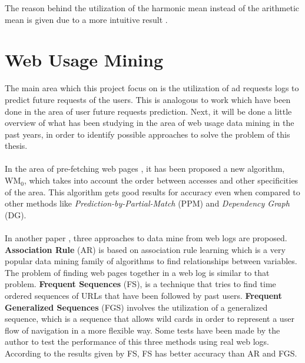 The reason behind the utilization of the harmonic mean instead of the arithmetic mean
is given due to a more intuitive result \cite{sasaki2007truth}.



\section{Web Usage Mining}\label{sec:network}

\nocite{UjwalaPatil}

The main area which this project focus on is the utilization of ad requests logs
to predict future requests of the users. This is analogous to work
which have been done in the area of user future requests prediction.
Next, it will be done a little overview of what has been studying in the area of web
usage data mining in the past years, in order to identify possible approaches
to solve the problem of this thesis.

\paragraph{}

In the area of pre-fetching web pages \cite{Nanopoulos01effectiveprediction}, it
has been proposed a new algorithm, WM\begin{math}_0\end{math}, which takes into
account the order between accesses and other specificities of the area. This
algorithm gets good results for accuracy even when compared to other methods
like \emph{Prediction-by-Partial-Match} (PPM) and \emph{Dependency Graph} (DG).

\paragraph{}

In another paper \cite{Gery:2003:EWU:956699.956716}, three approaches to
data mine from web logs are proposed. \textbf{Association Rule} (AR) is based on association rule
learning which is a very popular data mining family of algorithms to find relationships between
variables. The problem of finding web pages together in a web log is similar to
that problem. \textbf{Frequent Sequences} (FS), is a technique that tries to find time
ordered sequences of URLs that have been followed by past users.
\textbf{Frequent Generalized Sequences} (FGS) involves the utilization of a
generalized sequence, which is a
sequence that allows wild cards in order to represent a user flow of
navigation in a more flexible way. 
Some tests have been made by the author \cite{Gery:2003:EWU:956699.956716} to
test the performance of this three methods using real web logs. According to the
results given by FS, FS has better accuracy than AR and FGS.

